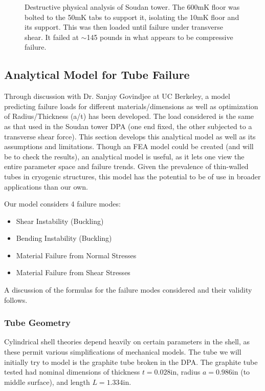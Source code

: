 \documentclass{report}
\begin{document}
\begin{figure}[ht]
\centering
{}
\qquad
{}
\caption{Destructive physical analysis of Soudan tower. The 600mK floor was bolted to the 50mK tabs to support it, isolating the 10mK floor and its support. This was then loaded until failure under transverse shear. It failed at $\sim$145 pounds in what appears to be compressive failure.}
\end{figure}

\subsection{Analytical Model for Tube Failure}

Through discussion with Dr. Sanjay Govindjee at UC Berkeley, a model predicting failure loads for different materials/dimensions as well as optimization of Radius/Thickness (a/t) has been developed. The load considered is the same as that used in the Soudan tower DPA (one end fixed, the other subjected to a transverse shear force). This section develops this analytical model as well as its assumptions and limitations. Though an FEA model could be created (and will be to check the results), an analytical model is useful, as it lets one view the entire parameter space and failure trends. Given the prevalence of thin-walled tubes in cryogenic structures, this model has the potential to be of use in broader applications than our own.

Our model considers 4 failure modes:
\begin{itemize}
\item Shear Instability (Buckling)
\item Bending Instability (Buckling)
\item Material Failure from Normal Stresses
\item Material Failure from Shear Stresses
\end{itemize}

A discussion of the formulas for the failure modes considered and their validity follows.

\subsubsection{Tube Geometry}
Cylindrical shell theories depend heavily on certain parameters in the shell, as these permit various simplifications of mechanical models. The tube we will initially try to model is the graphite tube broken in the DPA. The graphite tube tested had nominal dimensions of thickness $t = 0.028$in, radius $a = 0.986$in (to middle surface), and length $L=1.334$in.
\end{document}
